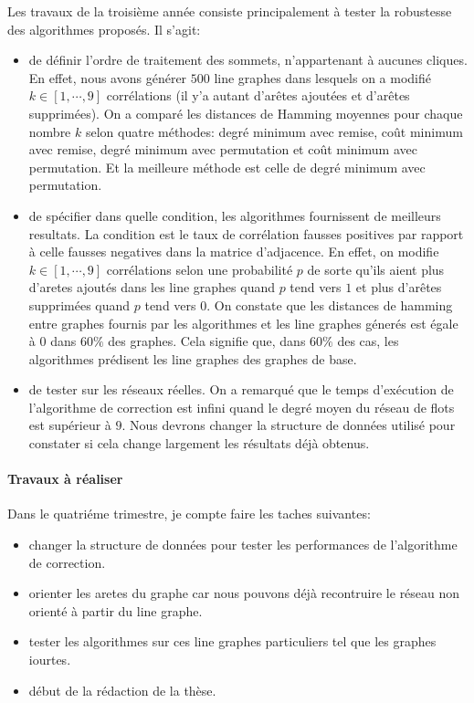 \documentclass [a4paper,10pt]{article}
\begin{document}
Les travaux de la troisi\`eme ann\'ee consiste principalement \`a tester la robustesse des algorithmes propos\'es. Il s'agit:
\begin{itemize}
	\item de d\'efinir l'ordre de traitement des sommets, n'appartenant \`a aucunes cliques. En effet, nous avons g\'en\'erer $500$ line graphes dans lesquels on a modifi\'e $k \in [1,\cdots,9]$ corr\'elations (il y'a autant d'ar\^etes ajout\'ees et d'ar\^etes supprim\'ees). On a compar\'e les distances de Hamming moyennes pour chaque nombre $k$ selon quatre m\'ethodes: degr\'e minimum avec remise, co\^ut minimum avec remise, degr\'e minimum avec permutation et co\^ut minimum avec permutation. Et la meilleure m\'ethode est celle de degr\'e minimum avec permutation.
	\item de sp\'ecifier dans quelle condition, les algorithmes fournissent de meilleurs resultats. La condition est le taux de corr\'elation fausses positives par rapport \`a celle fausses negatives dans la matrice d'adjacence. En effet, on  modifie $k \in [1,\cdots,9]$ corr\'elations selon une probabilit\'e $p$ de sorte qu'ils aient plus d'aretes ajout\'es dans les line graphes quand $p$ tend vers $1$ et plus d'ar\^etes supprim\'ees quand $p$ tend vers $0$. On constate que les distances de hamming entre graphes fournis par les algorithmes  et les line graphes g\'ener\'es est \'egale \`a $0$ dans $60\%$ des graphes. Cela signifie que, dans $60\%$ des cas, les algorithmes pr\'edisent les line graphes des graphes de base.  
	\item de tester sur les r\'eseaux r\'eelles. On a remarqu\'e que le temps d'ex\'ecution de l'algorithme de correction est infini quand le degr\'e moyen du r\'eseau de flots est sup\'erieur \`a $9$. Nous devrons changer la structure de donn\'ees utilis\'e pour constater si cela change largement les r\'esultats d\'ej\`a obtenus.  
\end{itemize}

\paragraph{Travaux \`a r\'ealiser}
Dans le quatri\'eme trimestre, je compte faire les taches suivantes:
\begin{itemize}
\item changer la structure de donn\'ees pour tester les performances de l'algorithme de correction.
\item orienter les aretes du graphe car nous pouvons d\'ej\`a recontruire le r\'eseau non orient\'e \`a partir du line graphe.
\item tester les algorithmes sur ces line graphes particuliers tel que les graphes iourtes.
\item d\'ebut de la r\'edaction de la th\`ese.
\end{itemize}


	
\end{document}
